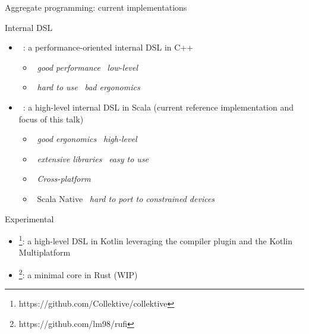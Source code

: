 \documentclass[presentation, 9pt]{beamer}\mode<presentation>{\usetheme{AMSBolognaFC}}
\begin{document}
\begin{frame}[allowframebreaks]{Aggregate programming: current implementations}
	\begin{exampleblock}{Internal DSL}
		\begin{itemize}
			\item {}~\cite{fcpp}: a performance-oriented internal DSL in C++
			\begin{itemize}
				\item \faThumbsUp \, \emph{good performance} \faArrowRight \, \emph{low-level}
				\item \faThumbsDown \, \emph{hard to use} \faArrowRight \, \emph{bad ergonomics}
			\end{itemize}
			\item \underline{}~\cite{scafi}: a high-level internal DSL in Scala (current reference implementation and focus of this talk)
			\begin{itemize}
				\item \faThumbsUp \, \emph{good ergonomics} \faArrowRight \, \emph{high-level}
				\item \faThumbsUp \, \emph{extensive libraries} \faArrowRight \, \emph{easy to use}
				\item \faThumbsUp \, \emph{Cross-platform}
				\item \faThumbsDown \, Scala Native \faArrowRight \, \emph{hard to port to constrained devices}
			\end{itemize}
		\end{itemize}
	\end{exampleblock}

    \begin{exampleblock}{Experimental}
			\begin{itemize}
        \item {}\footnote{https://github.com/Collektive/collektive}: a high-level DSL in Kotlin leveraging the compiler plugin and the Kotlin Multiplatform
        \item {}\footnote{https://github.com/lm98/rufi}: a minimal core in Rust (WIP)
			\end{itemize}
		\end{exampleblock}
\end{frame}
\end{document}
